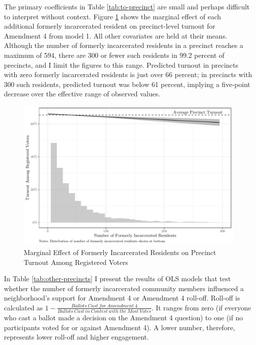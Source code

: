 \documentclass[
  12pt,
]{article}
\begin{document}
The primary coefficients in Table \ref{tab:to-precinct} are small and perhaps difficult to interpret without context. Figure \ref{fig:marg1} shows the marginal effect of each additional formerly incarcerated resident on precinct-level turnout for Amendment 4 from model 1. All other covariates are held at their means. Although the number of formerly incarcerated residents in a precinct reaches a maximum of 594, there are 300 or fewer such residents in 99.2 percent of precincts, and I limit the figures to this range. Predicted turnout in precincts with zero formerly incarcerated residents is just over 66 percent; in precincts with 300 such residents, predicted turnout was below 61 percent, implying a five-point decrease over the effective range of observed values.

\begin{figure}[H]

{\centering \includegraphics{amendment_4_turnout_files/figure-latex/marg1-1} 

}

\caption{\label{fig:marg1}Marginal Effect of Formerly Incarcerated Residents on Precinct Turnout Among Registered Voters}\label{fig:marg1}
\end{figure}

In Table \ref{tab:other-precincts} I present the results of OLS models that test whether the number of formerly incarcerated community members influenced a neighborhood's support for Amendment 4 or Amendment 4 roll-off. Roll-off is calculated as \(1 - \frac{Ballots\:Cast\:for\:Amendment\:4}{Ballots\:Cast\:in\:Contest\:with\:the\:Most\:Votes}\). It ranges from zero (if everyone who cast a ballot made a decision on the Amendment 4 question) to one (if no participants voted for or against Amendment 4). A lower number, therefore, represents lower roll-off and higher engagement.
\end{document}
